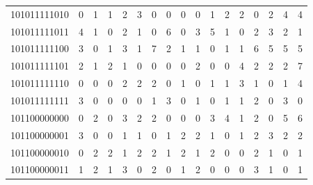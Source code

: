 \documentclass[10pt,a4paper]{article}
\begin{document}
\begin{longtable}{ |c|c|c|c|c|c|c|c|c|c|c|c|c|c|c|c|c| }
    101011111010              & 0                            & 1                                & 1                            & 2                              & 3   & 0   & 0   & 0   & 0   & 1   & 2   & 2   & 0   & 2   & 4   & 4   \\
    101011111011              & 4                            & 1                                & 0                            & 2                              & 1   & 0   & 6   & 0   & 3   & 5   & 1   & 0   & 2   & 3   & 2   & 1   \\
    101011111100              & 3                            & 0                                & 1                            & 3                              & 1   & 7   & 2   & 1   & 1   & 0   & 1   & 1   & 6   & 5   & 5   & 5   \\
    101011111101              & 2                            & 1                                & 2                            & 1                              & 0   & 0   & 0   & 0   & 2   & 0   & 0   & 4   & 2   & 2   & 2   & 7   \\
    101011111110              & 0                            & 0                                & 0                            & 2                              & 2   & 2   & 0   & 1   & 0   & 1   & 1   & 3   & 1   & 0   & 1   & 4   \\
    101011111111              & 3                            & 0                                & 0                            & 0                              & 0   & 1   & 3   & 0   & 1   & 0   & 1   & 1   & 2   & 0   & 3   & 0   \\
    101100000000              & 0                            & 2                                & 0                            & 3                              & 2   & 2   & 0   & 0   & 0   & 3   & 4   & 1   & 2   & 0   & 5   & 6   \\
    101100000001              & 3                            & 0                                & 0                            & 1                              & 1   & 0   & 1   & 2   & 2   & 1   & 0   & 1   & 2   & 3   & 2   & 2   \\
    101100000010              & 0                            & 2                                & 2                            & 1                              & 2   & 2   & 1   & 2   & 1   & 2   & 0   & 0   & 2   & 1   & 0   & 1   \\
    101100000011              & 1                            & 2                                & 1                            & 3                              & 0   & 2   & 0   & 1   & 2   & 0   & 0   & 0   & 3   & 1   & 0   & 1   \\

\end{longtable}
\end{document}

